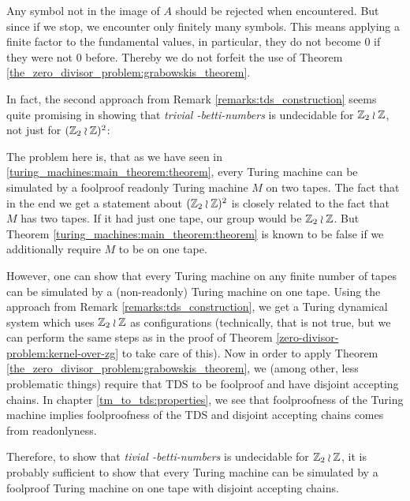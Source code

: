 \begin{Remark}
	Any symbol not in the image of $A$ should be rejected when encountered.
	But since if we stop, we encounter only finitely many symbols.
	This means applying a finite factor to the fundamental values, in particular, they do not become $0$ if they were not $0$ before.
	Thereby we do not forfeit the use of Theorem \ref{the_zero_divisor_problem:grabowskis_theorem}.
\end{Remark}

\begin{Remark}
	In fact, the second approach from Remark \ref{remarks:tds_construction} seems quite promising in showing that \emph{trivial \ltwo-betti-numbers} is undecidable for $\mathbb{Z}_2 \wr \mathbb{Z}$, not just for $(\mathbb{Z}_2 \wr \mathbb{Z})^2$:

	The problem here is, that as we have seen in \ref{turing_machines:main_theorem:theorem}, every Turing machine can be simulated by a foolproof readonly Turing machine $M$ on two tapes.
	The fact that in the end we get a statement about $(\mathbb{Z}_2 \wr \mathbb{Z})^2$ is closely related to the fact that $M$ has two tapes.
	If it had just one tape, our group would be $\mathbb{Z}_2 \wr \mathbb{Z}$.
	But Theorem \ref{turing_machines:main_theorem:theorem} is known to be false if we additionally require $M$ to be on one tape.

	However, one can show that every Turing machine on any finite number of tapes can be simulated by a (non-readonly) Turing machine on one tape.
	Using the approach from Remark \ref{remarks:tds_construction}, we get a Turing dynamical system which uses $\mathbb{Z}_2 \wr \mathbb{Z}$ as configurations (technically, that is not true, but we can perform the same steps as in the proof of Theorem \ref{zero-divisor-problem:kernel-over-zg} to take care of this).
	Now in order to apply Theorem \ref{the_zero_divisor_problem:grabowskis_theorem}, we (among other, less problematic things) require that TDS to be foolproof and have disjoint accepting chains.
	In chapter \ref{tm_to_tds:properties}, we see that foolproofness of the Turing machine implies foolproofness of the TDS and disjoint accepting chains comes from readonlyness.

	Therefore, to show that \emph{tivial \ltwo-betti-numbers} is undecidable for $\mathbb{Z}_2 \wr \mathbb{Z}$, it is probably sufficient to show that every Turing machine can be simulated by a foolproof Turing machine on one tape with disjoint accepting chains.


\end{Remark}
